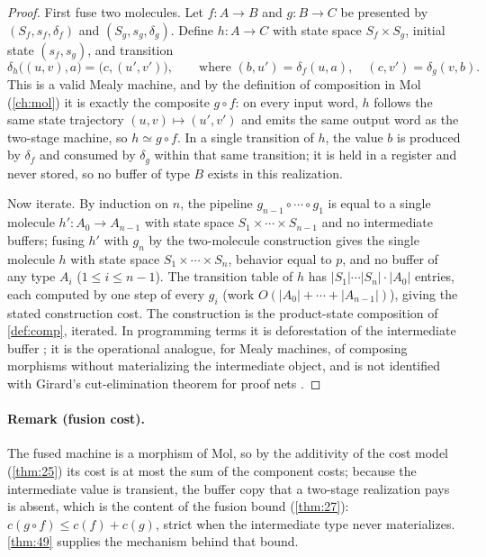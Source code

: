 \begin{proof}
First fuse two molecules. Let $f : A \to B$ and $g : B \to C$ be presented by $(S_f, s_f, \delta_f)$ and $(S_g, s_g, \delta_g)$. Define $h : A \to C$ with state space $S_f \times S_g$, initial state $(s_f, s_g)$, and transition
\[
\delta_h\bigl ((u, v), a\bigr) = \bigl (c, (u', v')\bigr),
\qquad \text{where } (b, u') = \delta_f (u, a), \quad (c, v') = \delta_g (v, b) .
\]
This is a valid Mealy machine, and by the definition of composition in Mol (\autoref{ch:mol}) it is exactly the composite $g \circ f$: on every input word, $h$ follows the same state trajectory $(u, v) \mapsto (u', v')$ and emits the same output word as the two-stage machine, so $h \simeq g \circ f$. In a single transition of $h$, the value $b$ is produced by $\delta_f$ and consumed by $\delta_g$ within that same transition; it is held in a register and never stored, so no buffer of type $B$ exists in this realization.

Now iterate. By induction on $n$, the pipeline $g_{n-1} \circ \cdots \circ g_1$ is equal to a single molecule $h' : A_0 \to A_{n-1}$ with state space $S_1 \times \cdots \times S_{n-1}$ and no intermediate buffers; fusing $h'$ with $g_n$ by the two-molecule construction gives the single molecule $h$ with state space $S_1 \times \cdots \times S_n$, behavior equal to $p$, and no buffer of any type $A_i$ ($1 \leq i \leq n-1$). The transition table of $h$ has $|S_1| \cdots |S_n| \cdot |A_0|$ entries, each computed by one step of every $g_i$ (work $O (|A_0| + \cdots + |A_{n-1}|)$), giving the stated construction cost. The construction is the product-state composition of \autoref{def:comp}, iterated. In programming terms it is deforestation of the intermediate buffer \citep{wadler}; it is the operational analogue, for Mealy machines, of composing morphisms without materializing the intermediate object, and is not identified with Girard's cut-elimination theorem for proof nets \citep{girard}.
\end{proof}

\paragraph{Remark (fusion cost).}
The fused machine is a morphism of Mol, so by the additivity of the cost model (\autoref{thm:25}) its cost is at most the sum of the component costs; because the intermediate value is transient, the buffer copy that a two-stage realization pays is absent, which is the content of the fusion bound (\autoref{thm:27}): $c (g \circ f) \leq c (f) + c (g)$, strict when the intermediate type never materializes. \autoref{thm:49} supplies the mechanism behind that bound.

